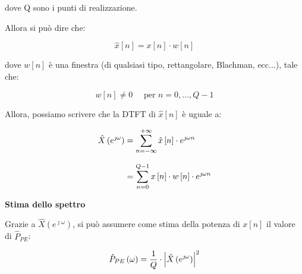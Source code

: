 dove Q sono i punti di realizzazione. \newline 

Allora si può dire che: 

{
    \Large 
    \begin{equation}
        \hat{x} \left[ n\right]
        = 
        x \left[ n\right] \cdot w \left[ n\right]
    \end{equation}
}

dove $w \left[ n\right]$ è una finestra (di qualsiasi tipo, rettangolare, Blachman, ecc...), tale che: 

{
    \Large 
    \begin{equation}
        w \left[ n\right]
        \neq 0 
        \quad 
        \text{ per }
        n = 0, \dots, Q - 1 
    \end{equation}
}

Allora, possiamo scrivere che la DTFT di $\hat{x} \left[ n\right]$ è uguale a: 

{
    \Large 
    \begin{equation}
        \setlength{\jot}{10pt} %
        \begin{split}
            \hat{X} \left(e^{\jmath \omega}\right)
            &= 
            \sum_{n = - \infty}^{+ \infty}
            \hat{x} \left[ n\right]
            \cdot 
            e^{\jmath \omega n}
            \\
            &= 
            \sum_{n = 0}^{Q - 1}
            x \left[ n\right] \cdot w \left[ n\right]
            \cdot 
            e^{\jmath \omega n}
        \end{split}
    \end{equation}
}

\newpage 

\textbf{Stima dello spettro} \newline 

Grazie a $\hat{X} \left(e^{\jmath \omega}\right)$, si può assumere come stima della potenza di $x \left[ n\right]$ il valore di $\hat{P}_{PE}$: 

{
    \Large 
    \begin{equation}
        \hat{P}_{PE} \left(\omega\right)
        = 
        \dfrac{1}{Q} \cdot \abs{\hat{X} \left(e^{\jmath \omega}\right)}^{2}
    \end{equation}
}

